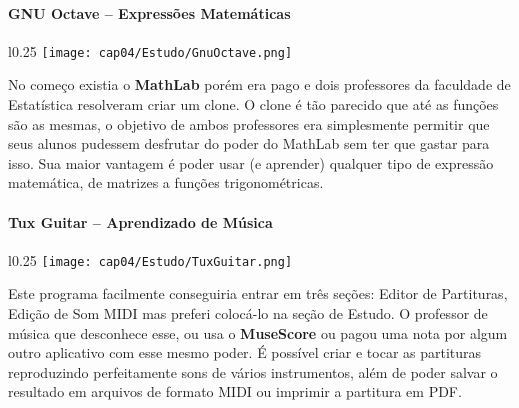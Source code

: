 \paragraph{GNU Octave – Expressões Matemáticas}
\begin{minipage}{\linewidth}
 \vspace{5pt}
 \begin{wrapfigure}{l}{0.25\textwidth}
  \vspace{-\baselineskip}
  \texttt{[image: cap04/Estudo/GnuOctave.png]} 
 \end{wrapfigure}
 No começo existia o \textbf{MathLab} porém era pago e dois professores da faculdade de Estatística resolveram criar um clone. O clone é tão parecido que até as funções são as mesmas, o objetivo de ambos professores era simplesmente permitir que seus alunos pudessem desfrutar do poder do MathLab sem ter que gastar para isso. Sua maior vantagem é poder usar (e aprender) qualquer tipo de expressão matemática, de matrizes a funções trigonométricas.
\end{minipage}

\paragraph{Tux Guitar – Aprendizado de Música}
\begin{minipage}{\linewidth}
 \vspace{5pt}
 \begin{wrapfigure}{l}{0.25\textwidth}
  \vspace{-\baselineskip}
  \texttt{[image: cap04/Estudo/TuxGuitar.png]} 
 \end{wrapfigure}
 Este programa facilmente conseguiria entrar em três seções: Editor de Partituras, Edição de Som MIDI mas preferi colocá-lo na seção de Estudo. O professor de música que desconhece esse, ou usa o \textbf{MuseScore} ou pagou uma nota por algum outro aplicativo com esse mesmo poder. É possível criar e tocar as partituras reproduzindo perfeitamente sons de vários instrumentos, além de poder salvar o resultado em arquivos de formato MIDI ou imprimir a partitura em PDF.
\end{minipage}

\clearpage